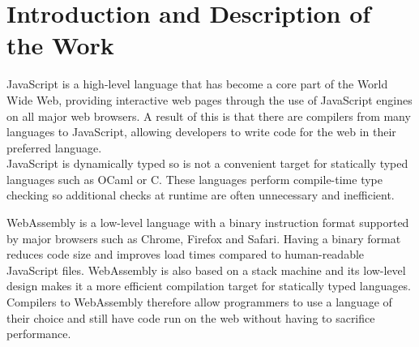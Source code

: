 \documentclass[12pt]{article}
\newcommand{\al}{$<$}
\newcommand{\ar}{$>$}
\begin{document}
%
%
%
%
%
%
%
%
%
%
%
%
%
%
%
%
%
%
%
%
%

\section*{Introduction and Description of the Work}
JavaScript is a high-level language that has become a core part of the World Wide Web, providing interactive web pages through the use of JavaScript engines on all major web browsers. A result of this is that there are compilers from many languages to JavaScript, allowing developers to write code for the web in their preferred language. \\
JavaScript is dynamically typed so is not a convenient target for statically typed languages such as OCaml or C. These languages perform compile-time type checking so additional checks at runtime are often unnecessary and inefficient. 

WebAssembly is a low-level language with a binary instruction format supported by major browsers such as Chrome, Firefox and Safari. Having a binary format reduces code size and improves load times compared to human-readable JavaScript files. WebAssembly is also based on a stack machine and its low-level design makes it a more efficient compilation target for statically typed languages. Compilers to WebAssembly therefore allow programmers to use a language of their choice and still have code run on the web without having to sacrifice performance.
\end{document}
